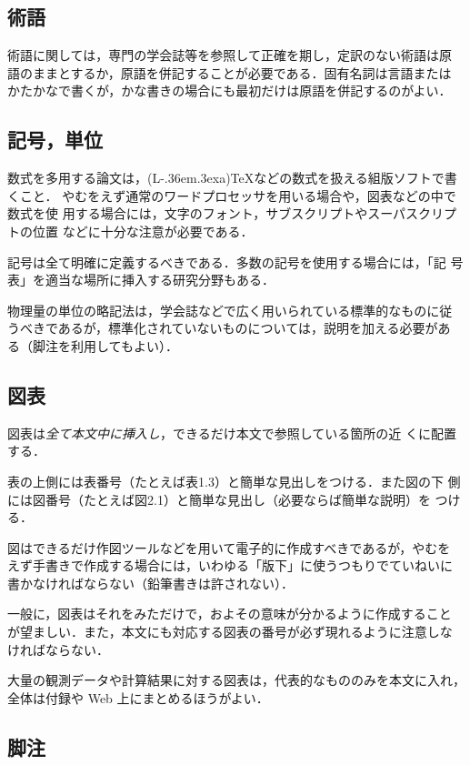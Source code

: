 \documentclass{kuisthesis}			%
\def\LATEX{{\rm (L\kern-.36em\raise.3ex\hbox{\sc a})\TeX}}
\begin{document}
\subsection{術語}
術語に関しては，専門の学会誌等を参照して正確を期し，定訳のない術語は原
語のままとするか，原語を併記することが必要である．固有名詞は言語または
かたかなで書くが，かな書きの場合にも最初だけは原語を併記するのがよい．

\subsection{記号，単位}\label{subsec-symbol}
数式を多用する論文は，\LATEX などの数式を扱える組版ソフトで書くこと．
やむをえず通常のワードプロセッサを用いる場合や，図表などの中で数式を使
用する場合には，文字のフォント，サブスクリプトやスーパスクリプトの位置
などに十分な注意が必要である．

記号は全て明確に定義するべきである．多数の記号を使用する場合には，「記
  号表」を適当な場所に挿入する研究分野もある．

物理量の単位の略記法は，学会誌などで広く用いられている標準的なものに従
うべきであるが，標準化されていないものについては，説明を加える必要があ
る（脚注を利用してもよい）．

\subsection{図表}\label{subsec-figure}
図表は\emph{全て本文中に挿入し}，できるだけ本文で参照している箇所の近
くに配置する．

表の上側には表番号（たとえば表1.3）と簡単な見出しをつける．また図の下
側には図番号（たとえば図2.1）と簡単な見出し（必要ならば簡単な説明）を
つける．

図はできるだけ作図ツールなどを用いて電子的に作成すべきであるが，やむを
えず手書きで作成する場合には，いわゆる「版下」に使うつもりでていねいに
書かなければならない（鉛筆書きは許されない）．

一般に，図表はそれをみただけで，およその意味が分かるように作成すること
が望ましい．また，本文にも対応する図表の番号が必ず現れるように注意しな
ければならない．

大量の観測データや計算結果に対する図表は，代表的なもののみを本文に入れ，
全体は付録や Web 上にまとめるほうがよい．

\subsection{脚注}\label{subsec-footnote}
\end{document}
